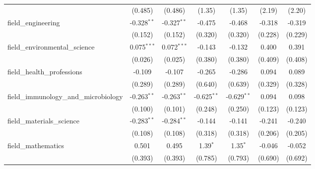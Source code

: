 \begin{tabular}{lcccccc}
                                                               & (0.485)        & (0.486)        & (1.35)         & (1.35)         & (2.19)         & (2.20)\\   
   field\_engineering                                          & -0.328$^{**}$  & -0.327$^{**}$  & -0.475         & -0.468         & -0.318         & -0.319\\   
                                                               & (0.152)        & (0.152)        & (0.320)        & (0.320)        & (0.228)        & (0.229)\\   
   field\_environmental\_science                               & 0.075$^{***}$  & 0.072$^{***}$  & -0.143         & -0.132         & 0.400          & 0.391\\   
                                                               & (0.026)        & (0.025)        & (0.380)        & (0.380)        & (0.409)        & (0.408)\\   
   field\_health\_professions                                  & -0.109         & -0.107         & -0.265         & -0.286         & 0.094          & 0.089\\   
                                                               & (0.289)        & (0.289)        & (0.640)        & (0.639)        & (0.329)        & (0.328)\\   
   field\_immunology\_and\_microbiology                        & -0.263$^{**}$  & -0.263$^{**}$  & -0.625$^{**}$  & -0.629$^{**}$  & 0.094          & 0.098\\   
                                                               & (0.100)        & (0.101)        & (0.248)        & (0.250)        & (0.123)        & (0.123)\\   
   field\_materials\_science                                   & -0.283$^{**}$  & -0.284$^{**}$  & -0.144         & -0.141         & -0.241         & -0.240\\   
                                                               & (0.108)        & (0.108)        & (0.318)        & (0.318)        & (0.206)        & (0.205)\\   
   field\_mathematics                                          & 0.501          & 0.495          & 1.39$^{*}$     & 1.35$^{*}$     & -0.046         & -0.052\\   
                                                               & (0.393)        & (0.393)        & (0.785)        & (0.793)        & (0.690)        & (0.692)\\   

\end{tabular}
